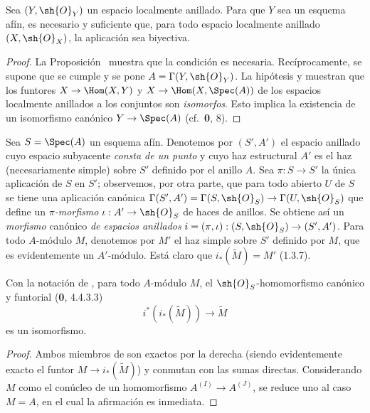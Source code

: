 \begin{corollary}[1.8.3]
\label{ega2:addendum:I.1.8.3-fr}
Sea $(Y,\sh{O}_Y)$ un espacio localmente anillado. Para que $Y$ sea un
esquema afín, es necesario y suficiente que, para todo espacio
localmente anillado $(X,\sh{O}_X)$, la aplicación  sea
biyectiva.
\end{corollary}

\begin{proof}
La Proposición~ muestra que la condición es necesaria.
Recíprocamente, se supone que se cumple y se pone
$A=\Gamma(Y,\sh{O}_Y)$. La hipótesis y  muestran que los
funtores
$X\to\Hom(X,Y)$ y $X\to\Hom(X,\Spec(A))$
de los espacios localmente anillados a los conjuntos son \emph{isomorfos}.
Esto implica la existencia de un isomorfismo canónico
$Y\to\Spec(A)$ (cf.~\textbf 0, 8).
\end{proof}

\begin{env}[1.8.4]
\label{ega2:addendum:I.1.8.4-fr}
Sea $S=\Spec(A)$ un esquema afín. Denotemos por $(S',A')$ el espacio
anillado cuyo espacio subyacente \emph{consta de un punto} y cuyo haz
estructural $A'$ es el haz (necesariamente simple) sobre $S'$ definido
por el anillo $A$. Sea $\pi:S\to S'$ la única aplicación de $S$ en $S'$; observemos, por otra parte, que para todo
abierto $U$ de $S$ se tiene una aplicación canónica
$\Gamma(S',A')=\Gamma(S,\sh{O}_S)\to\Gamma(U,\sh{O}_S)$
que define un \emph{$\pi$-morfismo} $\iota:A'\to\sh{O}_S$ de haces de anillos.
Se obtiene así un \emph{morfismo} canónico \emph{de espacios anillados}
$i=(\pi,\iota):(S,\sh{O}_S)\to(S',A')$.
Para todo $A$-módulo $M$, denotemos por $M'$ el haz simple sobre $S'$
definido por $M$, que es evidentemente un $A'$-módulo. Está claro que
$i_*(\widetilde M)=M'$ (1.3.7).
\end{env}

\begin{lemma}[1.8.5]
\label{ega2:addendum:I.1.8.5-fr}
Con la notación de , para todo $A$-módulo $M$, el
$\sh{O}_S$-homomorfismo canónico y funtorial \textup{(\textbf{0}, 4.4.3.3)}
\begin{equation}
\label{ega2:addendum:I.1.8.5.1-fr}
  i^*(i_*(\widetilde M))\to\widetilde M
\tag{1.8.5.1}
\end{equation}
es un isomorfismo.
\end{lemma}

\begin{proof}
Ambos miembros de  son exactos por la derecha
(siendo evidentemente exacto el funtor
$M\to i_*(\widetilde M)$) y conmutan con las sumas directas.
Considerando $M$ como el conúcleo de un homomorfismo
$A^{(I)}\to A^{(J)}$, se reduce uno al caso $M=A$, en el cual la
afirmación es inmediata.
\end{proof}

